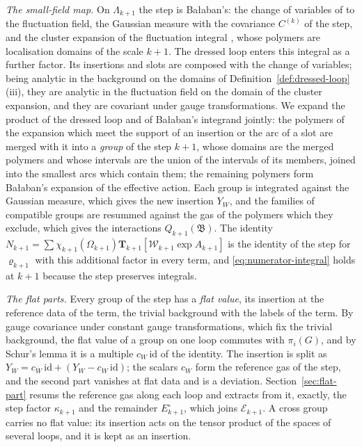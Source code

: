 \documentclass[11pt]{preprint}
\numberwithin{equation}{section}
\theoremstyle{definition}
\theoremstyle{remark}
\theoremstyle{plain}
\begin{document}
\emph{The small-field map.} On $\Lambda_{k+1}$ the step is Ba{\l}aban's: the change of variables of \cite[(3.22), p.~269]{BalabanCRE} to the fluctuation field, the Gaussian measure with the covariance $C^{(k)}$ of the step, and the cluster expansion of the fluctuation integral \cite[Sect.~2]{BalabanRG2}, whose polymers are localisation domains of the scale $k + 1$. The dressed loop enters this integral as a further factor. Its insertions and slots are composed with the change of variables; being analytic in the background on the domains of Definition~\ref{def:dressed-loop}(iii), they are analytic in the fluctuation field on the domain of the cluster expansion, and they are covariant under gauge transformations. We expand the product of the dressed loop and of Ba{\l}aban's integrand jointly: the polymers of the expansion which meet the support of an insertion or the arc of a slot are merged with it into a \emph{group} of the step $k + 1$, whose domains are the merged polymers and whose intervals are the union of the intervals of its members, joined into the smallest arcs which contain them; the remaining polymers form Ba{\l}aban's expansion of the effective action. Each group is integrated against the Gaussian measure, which gives the new insertion $Y_W$, and the families of compatible groups are resummed against the gas of the polymers which they exclude, which gives the interactions $Q_{k+1}(\mathfrak B)$. The identity $N_{k+1} = \sum\chi_{k+1}(\Omega_{k+1})\mathbf T_{k+1}[\mathcal W_{k+1}\exp A_{k+1}]$ is the identity of the step for $\varrho_{k+1}$ with this additional factor in every term, and \eqref{eq:numerator-integral} holds at $k + 1$ because the step preserves integrals.

\emph{The flat parts.} Every group of the step has a \emph{flat value}, its insertion at the reference data of the term, the trivial background with the labels of the term. By gauge covariance under constant gauge transformations, which fix the trivial background, the flat value of a group on one loop commutes with $\pi_i(G)$, and by Schur's lemma it is a multiple $c_W\,\mathrm{id}$ of the identity. The insertion is split as $Y_W = c_W\,\mathrm{id} + (Y_W - c_W\,\mathrm{id})$; the scalars $c_W$ form the reference gas of the step, and the second part vanishes at flat data and is a deviation. Section~\ref{sec:flat-part} resums the reference gas along each loop and extracts from it, exactly, the step factor $\kappa_{k+1}$ and the remainder $E^{\circ}_{k+1}$, which joins $\mathcal E_{k+1}$. A cross group carries no flat value: its insertion acts on the tensor product of the spaces of several loops, and it is kept as an insertion.
\end{document}
